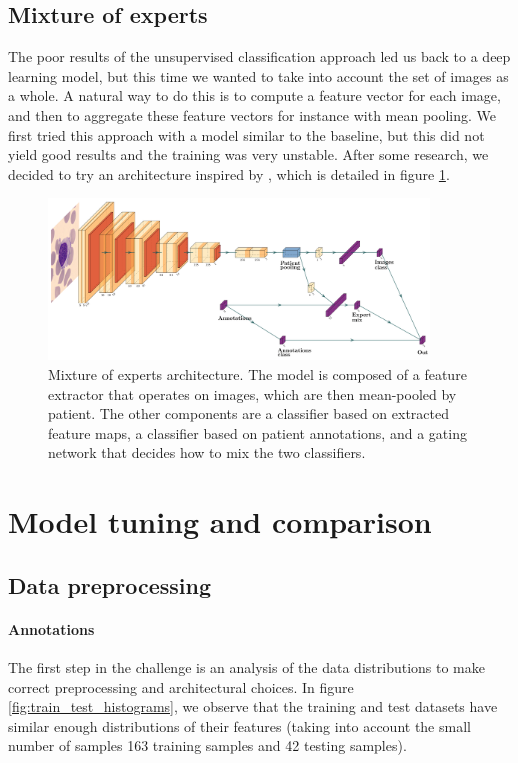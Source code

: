 \documentclass{midl}
\begin{document}
\subsection{Mixture of experts}
The poor results of the unsupervised classification approach led us back to a deep learning model, but this time we wanted to take into account the set of images as a whole. A natural way to do this is to compute a feature vector for each image, and then to aggregate these feature vectors for instance with mean pooling. We first tried this approach with a model similar to the baseline, but this did not yield good results and the training was very unstable. After some research, we decided to try an architecture inspired by \cite{Sahasrabudhe_2021}, which is detailed in figure \ref{fig:mixture_of_experts}.

\begin{figure}[H]
    \centering
    \includegraphics[width=0.9\textwidth]{figures/moe.png}
    \vspace*{-\baselineskip}
    \caption{Mixture of experts architecture. The model is composed of a feature extractor that operates on images, which are then mean-pooled by patient. The other components are a classifier based on extracted feature maps, a classifier based on patient annotations, and a gating network that decides how to mix the two classifiers.}
    \label{fig:mixture_of_experts}
\end{figure}

\section{Model tuning and comparison}
\label{sec:evaluation}

\subsection{Data preprocessing}

\paragraph*{Annotations}
The first step in the challenge is an analysis of the data distributions to make correct preprocessing and architectural choices. In figure \ref{fig:train_test_histograms}, we observe that the training and test datasets have similar enough distributions of their features (taking into account the small number of samples 163 training samples and 42 testing samples).
\end{document}
